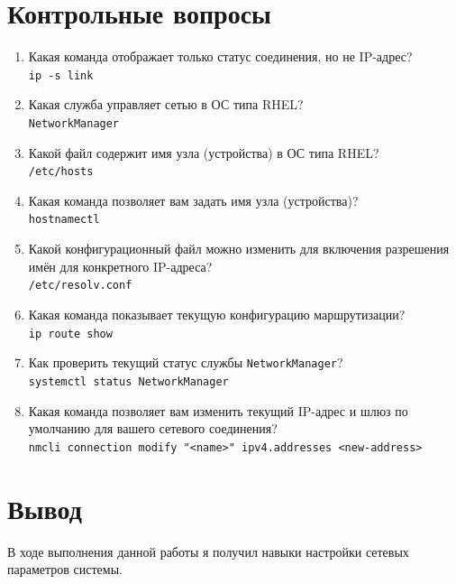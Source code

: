 \documentclass[12pt]{article}
\begin{document}
\section{Контрольные вопросы}
\begin{enumerate}
	\item Какая команда отображает только статус соединения, но не IP-адрес? \\
	      \texttt{ip -s link}
	\item Какая служба управляет сетью в ОС типа RHEL? \\
	      \texttt{NetworkManager}
	\item Какой файл содержит имя узла (устройства) в ОС типа RHEL? \\
	      \texttt{/etc/hosts}
	\item Какая команда позволяет вам задать имя узла (устройства)? \\
	      \texttt{hostnamectl}
	\item Какой конфигурационный файл можно изменить для включения разрешения имён для конкретного IP-адреса? \\
	      \texttt{/etc/resolv.conf}
	\item Какая команда показывает текущую конфигурацию маршрутизации? \\
	      \texttt{ip route show}
	\item Как проверить текущий статус службы \texttt{NetworkManager}? \\
	      \texttt{systemctl status NetworkManager}
	\item Какая команда позволяет вам изменить текущий IP-адрес и шлюз по умолчанию для вашего сетевого соединения? \\
	      \texttt{nmcli connection modify "<name>" ipv4.addresses <new-address>}
\end{enumerate}


\section{Вывод}
В ходе выполнения данной работы я получил навыки настройки сетевых параметров системы.
\end{document}
